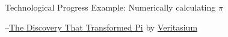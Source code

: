 \documentclass{beamer}
\begin{document}
\begin{frame}[standout]{Technological Progress Example: Numerically calculating $ \pi  $}
\label{slide:Example_of_Technological_Progress__Numerically_calculating____pi___}

    --\href{https://www.youtube.com/watch?v=gMlf1ELvRzc}{The Discovery That Transformed Pi} by \href{https://www.youtube.com/channel/UCHnyfMqiRRG1u-2MsSQLbXA}{Veritasium }

\end{frame}
\end{document}
